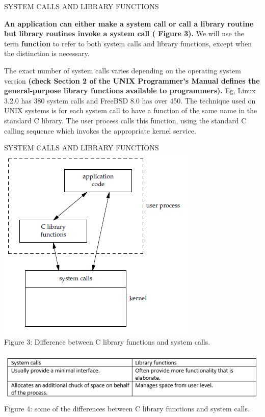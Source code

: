 \documentclass{beamer}
\begin{document}
\begin{frame}{SYSTEM CALLS AND LIBRARY FUNCTIONS}

\textbf{An application can either make a system call or call a library routine but library routines invoke a system call ( Figure 3).}
We will use the term \textbf{function} to refer to both system calls and library functions, except when the distinction is necessary.

The exact number of system  calls varies depending on the operating system version \textbf{(check Section 2 of the UNIX Programmer’s Manual defines the general-purpose library functions available to programmers).} Eg, Linux 3.2.0 has 380 system calls and FreeBSD 8.0 has over 450. The technique used on UNIX systems is for each system call to have a function of the same name in the standard C library. The user process calls this function, using the standard C calling sequence  which invokes the appropriate kernel service.

\end{frame}
\begin{frame}[t]{SYSTEM CALLS AND LIBRARY FUNCTIONS}
\centering
\includegraphics[scale=0.4]{system.png}\\[2pt]
Figure 3: Difference between C library functions and system calls.

\includegraphics[scale=0.5]{diff.png}\\[2pt]
Figure 4: some of the differences between C library functions and system calls.



\end{frame}
\end{document}
